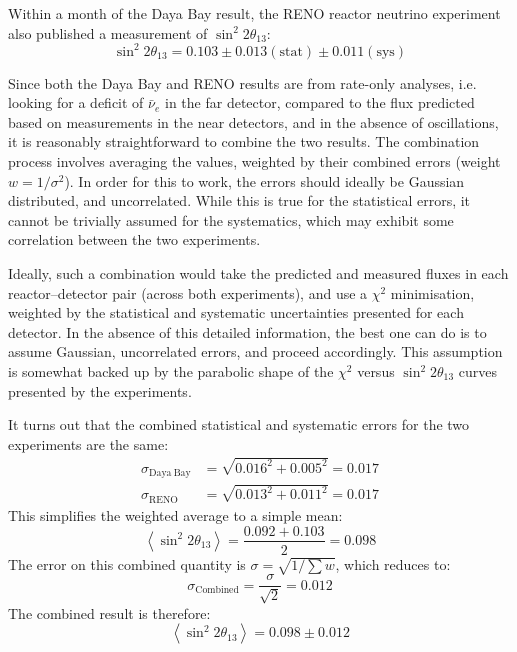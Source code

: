 Within a month of the Daya Bay result, the RENO reactor neutrino experiment also published a measurement of $\sin^2 2\theta_{13}$\citep{Ahn2012}:
\begin{equation}\label{eqn:reactor_parameters_reno}
\sin^2 2\theta_{13} = 0.103 \pm 0.013 (\mathrm{stat}) \pm 0.011 (\mathrm{sys})
\end{equation}

Since both the Daya Bay and RENO results are from rate-only analyses, i.e. looking for a deficit of $\bar{\nu}_e$ in the far detector, compared to the flux predicted based on measurements in the near detectors, and in the absence of oscillations, it is reasonably straightforward to combine the two results. The combination process involves averaging the values, weighted by their combined errors (weight $w = 1/\sigma^2$). In order for this to work, the errors should ideally be Gaussian distributed, and uncorrelated. While this is true for the statistical errors, it cannot be trivially assumed for the systematics, which may exhibit some correlation between the two experiments.

Ideally, such a combination would take the predicted and measured fluxes in each reactor--detector pair (across both experiments), and use a $\chi^2$ minimisation, weighted by the statistical and systematic uncertainties presented for each detector. In the absence of this detailed information, the best one can do is to assume Gaussian, uncorrelated errors, and proceed accordingly. This assumption is somewhat backed up by the parabolic shape of the $\chi^2$ versus $\sin^2 2\theta_{13}$ curves presented by the experiments\citep{An2012, Ahn2012}.

It turns out that the combined statistical and systematic errors for the two experiments are the same:
\begin{align}
\sigma_{\mathrm{Daya~Bay}} & = \sqrt{0.016^2 + 0.005^2} = 0.017 \\
\sigma_{\mathrm{RENO}} & = \sqrt{0.013^2 + 0.011^2} = 0.017 \nonumber
\end{align}
This simplifies the weighted average to a simple mean:
\begin{equation}
\left<\sin^2 2\theta_{13}\right> = \frac{0.092 + 0.103}{2} = 0.098
\end{equation}
The error on this combined quantity is $\sigma = \sqrt{1 / \sum w}$, which reduces to:
\begin{equation}
\sigma_{\mathrm{Combined}} = \frac{\sigma}{\sqrt{2}} = 0.012
\end{equation}
The combined result is therefore:
\begin{equation}\label{eqn:theta_13_combined}
\left<\sin^2 2\theta_{13}\right> = 0.098 \pm 0.012
\end{equation}

